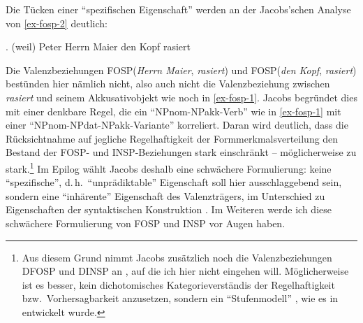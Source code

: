 Die Tücken einer "`spezifischen Eigenschaft"' werden an der Jacobs'schen Analyse von \ref{ex-fosp-2} deutlich:

\ex. \label{ex-fosp-2}(weil) Peter Herrn Maier den Kopf rasiert

Die Valenzbeziehungen FOSP({\it Herrn Maier}, {\it rasiert}) und FOSP({\it den Kopf}, {\it rasiert}) bestünden hier nämlich nicht, also auch nicht die Valenzbeziehung zwischen {\it rasiert} und seinem Akku\-sativ\-objekt wie noch in \ref{ex-fosp-1}. Jacobs begründet dies mit einer denkbare Regel, die ein "`NPnom-NPakk-Verb"' wie in \ref{ex-fosp-1} mit einer "`NPnom-NPdat-NPakk-Variante"' korreliert. Daran wird deutlich, dass die Rücksichtnahme auf jegliche Regelhaftigkeit der Formmerkmalsverteilung den Bestand der FOSP- und INSP-Beziehun\-gen stark einschränkt -- möglicherweise zu stark.\footnote{Aus diesem Grund nimmt Jacobs zusätzlich noch die Valenzbeziehungen DFOSP und DINSP an \citep[25]{Jacobs:94}, auf die ich hier nicht eingehen will. Möglicherweise ist es besser, kein dichotomisches Kategorieverständis der Regelhaftigkeit bzw.\ Vorhersagbarkeit anzusetzen, sondern ein "`Stufenmodell"' \citep[181]{Agel:00}, wie es in \cite{Breindl:89} entwickelt wurde.} Im Epilog wählt Jacobs deshalb eine schwächere Formulierung: keine "`spezifische"', d.\,h.\ "`unprädiktable"' Eigenschaft soll hier ausschlaggebend sein, sondern eine "`inhärente"' Eigenschaft des Valenzträgers, im Unterschied zu Eigenschaften der syntaktischen Konstruktion \citep[71f]{Jacobs:94}. Im Weiteren werde ich diese schwächere Formulierung von FOSP und INSP vor Augen haben.

